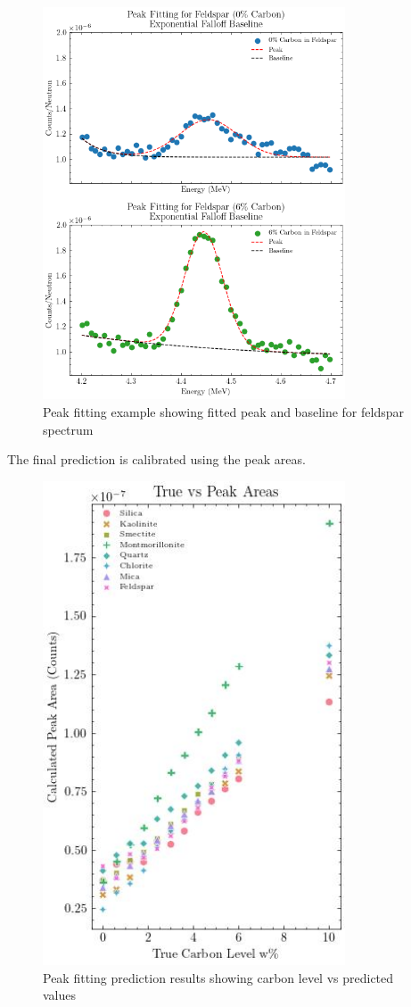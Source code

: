 \begin{figure}[H]
\centering
\includegraphics[width=0.8\textwidth]{../Figures/Analysis/peak_fitting_feldspar_subplots.png}
\caption{Peak fitting example showing fitted peak and baseline for feldspar spectrum}
\label{fig:peak_fitting}
\end{figure}

The final prediction is calibrated using the peak areas.

\begin{figure}[H]
\centering
\includegraphics[width=0.8\textwidth]{../Figures/Analysis/carbon_level_vs_predicted_pf.jpg}
\caption{Peak fitting prediction results showing carbon level vs predicted values}
\label{fig:peak_predictions}
\end{figure}